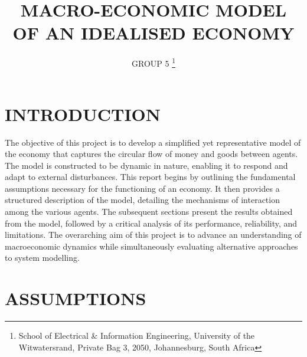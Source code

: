 \documentclass[10pt,onecolumn]{witseiepaper}
\begin{document}
\title{MACRO-ECONOMIC MODEL OF AN IDEALISED ECONOMY}

\author{GROUP 5
\thanks{School of Electrical \& Information Engineering, University of the
Witwatersrand, Private Bag 3, 2050, Johannesburg, South Africa}
}


%



\maketitle
\pagestyle{empty}


%
\section{INTRODUCTION}

The objective of this project is to develop a simplified yet representative model of the economy that captures the circular flow of money and goods between agents. The model is constructed to be dynamic in nature, enabling it to respond and adapt to external disturbances.  
This report begins by outlining the fundamental assumptions necessary for the functioning of an economy. It then provides a structured description of the model, detailing the mechanisms of interaction among the various agents. The subsequent sections present the results obtained from the model, followed by a critical analysis of its performance, reliability, and limitations.  
The overarching aim of this project is to advance an understanding of macroeconomic dynamics while simultaneously evaluating alternative approaches to system modelling.

\section{ASSUMPTIONS}
\end{document}
